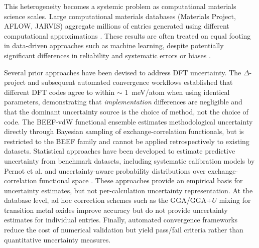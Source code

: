 \documentclass[twocolumn,superscriptaddress,amsmath,amssymb,longbibliography]{revtex4-2}
\newcommand{\meth}{\mathrm{method}}
\begin{document}
This heterogeneity becomes a systemic problem as computational materials
science scales. Large computational materials databases (Materials Project, AFLOW, JARVIS) aggregate millions of entries generated using different computational approximations \cite{Jain2013, Curtarolo2012,Choudhary2020,Kirklin2015_OQMD,Draxl2019_NOMAD,Andersen2021_OPTIMADE}. These results are often treated on equal footing in data-driven approaches such as machine learning, despite potentially significant differences in reliability and systematic errors or biases \cite{Bartel2020_critical_ML}.

Several prior approaches have been devised to address DFT uncertainty. The $\Delta$-project \cite{Lejaeghere2016} and subsequent automated convergence
workflows \cite{Bosoni2024_ACWF} established that different DFT codes agree to
within $\sim$ 1~meV/atom when using identical parameters, demonstrating that
\emph{implementation} differences are negligible and that the dominant
uncertainty source is the choice of method, not the choice of code.
The BEEF-vdW functional ensemble \cite{Wellendorff2012,Pandey2015_mBEEF}
estimates methodological uncertainty directly through Bayesian sampling of
exchange-correlation functionals, but is restricted to the BEEF family
and cannot be applied retrospectively to existing datasets. %
Statistical approaches have been developed to estimate predictive uncertainty from benchmark datasets, including systematic calibration models by Pernot et al.
 \cite{Pernot2015,Pernot2020,Simm2016} and uncertainty-aware probability distributions over exchange-correlation functional space \cite{Hansen2025}. These approaches provide an empirical basis for uncertainty estimates, but not  per-calculation uncertainty representation.
At the database level, ad hoc correction schemes such as the GGA/GGA+$U$
mixing for transition metal
oxides \cite{Jain2011_GGA_U,Wang2006_oxidation,Hautier2012} improve accuracy but do not provide uncertainty estimates for individual entries. Finally, automated convergence
frameworks \cite{Huber2020_AiiDA,Wisesa2016,Mathew2017_atomate,Ong2013_pymatgen}
reduce the cost of numerical validation but yield pass/fail criteria rather than quantitative uncertainty measures.
\end{document}
